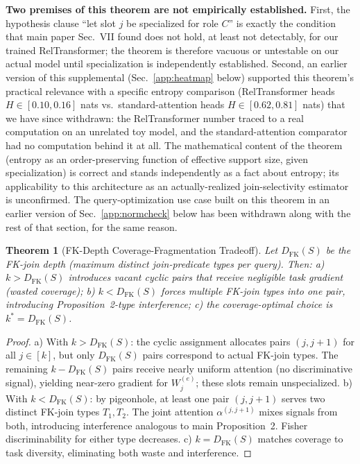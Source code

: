 \documentclass[conference]{IEEEtran}
\newtheorem{theorem}{Theorem}
\begin{document}
\textbf{Two premises of this theorem are not empirically established.} First, the hypothesis clause ``let slot $j$ be specialized for role $C$'' is exactly the condition that main paper Sec.~VII found does not hold, at least not detectably, for our trained RelTransformer; the theorem is therefore vacuous or untestable on our actual model until specialization is independently established. Second, an earlier version of this supplemental (Sec.~\ref{app:heatmap} below) supported this theorem's practical relevance with a specific entropy comparison (RelTransformer heads $H\in[0.10,0.16]$ nats vs.\ standard-attention heads $H\in[0.62,0.81]$ nats) that we have since withdrawn: the RelTransformer number traced to a real computation on an unrelated toy model, and the standard-attention comparator had no computation behind it at all. The mathematical content of the theorem (entropy as an order-preserving function of effective support size, given specialization) is correct and stands independently as a fact about entropy; its applicability to this architecture as an actually-realized join-selectivity estimator is unconfirmed. The query-optimization use case built on this theorem in an earlier version of Sec.~\ref{app:normcheck} below has been withdrawn along with the rest of that section, for the same reason.

\begin{theorem}[FK-Depth Coverage-Fragmentation Tradeoff]
\label{thm:app6}
Let $D_{\mathrm{FK}}(S)$ be the FK-join depth (maximum distinct join-predicate types per query). Then: \textup{a)} $k > D_{\mathrm{FK}}(S)$ introduces vacant cyclic pairs that receive negligible task gradient (wasted coverage); \textup{b)} $k < D_{\mathrm{FK}}(S)$ forces multiple FK-join types into one pair, introducing Proposition~2-type interference; \textup{c)} the coverage-optimal choice is $k^* = D_{\mathrm{FK}}(S)$.
\end{theorem}
\begin{proof}
	\renewcommand{\qedsymbol}{}
a) With $k > D_{\mathrm{FK}}(S)$: the cyclic assignment allocates pairs $(j, j{+}1)$ for all $j \in [k]$, but only $D_{\mathrm{FK}}(S)$ pairs correspond to actual FK-join types. The remaining $k - D_{\mathrm{FK}}(S)$ pairs receive nearly uniform attention (no discriminative signal), yielding near-zero gradient for $W_j^{(e)}$; these slots remain unspecialized. b) With $k < D_{\mathrm{FK}}(S)$: by pigeonhole, at least one pair $(j, j{+}1)$ serves two distinct FK-join types $T_1, T_2$. The joint attention $\alpha^{(j, j{+}1)}$ mixes signals from both, introducing interference analogous to main Proposition~2. Fisher discriminability for either type decreases. c) $k = D_{\mathrm{FK}}(S)$ matches coverage to task diversity, eliminating both waste and interference.
\end{proof}
\end{document}
